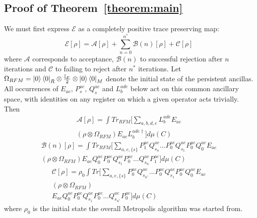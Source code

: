 \documentclass[aps,floatfix,10pt,amssymb,amsfont,amsmath,superscriptaddress,float,nofootinbib,longbibliography,nobalancelastpage,twocolumn]{revtex4-2}
\begin{document}
\subsection{Proof of Theorem~\ref{theorem:main}}
\label{section:proofmain}
We must first express $\mathcal{E}$ as a completely positive trace preserving map:
\begin{equation}
    \mathcal{E}[\rho] = \mathcal{A}[\rho] + \sum_{n=0}^{n^*} \mathcal{B}(n)[\rho] + \mathcal{C}[\rho]
\end{equation}
where $\mathcal{A}$ corresponds to acceptance, $\mathcal{B}(n)$ to successful rejection after $n$ iterations and $\mathcal{C}$ to failing to reject after $n^*$ iterations. Let $\Omega_{RFM} =\ket{0}\bra{0}_R\otimes \frac{\mathbb{I}_F}{2}\otimes\ket{0}\bra{0}_M$ denote the initial state of the persistent ancillas. All occurrences of $E_{ae}$, $P_s^{ae}$, $Q_s^{ae}$ and $L_b^{ade}$ below act on this common ancillary space, with identities on any register on which a given operator acts trivially. Then
\begin{multline}
    \mathcal{A}[\rho] = \int  Tr_{RFM}\bigg[\sum_{a,b,d,e}L_b^{ade} E_{ae} \\( \rho\otimes \Omega_{RFM}) 
     E_{ae}L^{ade\dagger}_b\bigg]d\mu(C)
\end{multline}
\begin{multline}
    \mathcal{B}(n)[\rho] = \int Tr_{RFM}\bigg[\sum_{a,e,\{s\}}P^{ae}_1Q^{ae}_{s_n}\ldots P^{ae}_0Q^{ae}_{s_1}P^{ae}_0Q^{ae}_0E_{ae}\\ ( \rho\otimes \Omega_{RFM})E_{ae}Q^{ae}_0P^{ae}_0Q^{ae}_{s_1}P^{ae}_0\ldots Q^{ae}_{s_n}P^{ae}_1\bigg]d\mu(C)
\end{multline}
\begin{multline}
    \mathcal{C}[\rho] = \rho_0 \int Tr\bigg[\sum_{a,e,\{s\}}P^{ae}_0Q^{ae}_{s_{n^*}}\ldots P^{ae}_0Q^{ae}_{s_1}P^{ae}_0Q^{ae}_0E_{ae}\\ ( \rho\otimes \Omega_{RFM})\\E_{ae}Q^{ae}_0P^{ae}_0Q^{ae}_{s_1}P^{ae}_0\ldots Q^{ae}_{s_{n^*}}P^{ae}_0\bigg]d\mu(C) 
\end{multline}
where $\rho_0$ is the initial state the overall Metropolis algorithm was started from. 
\end{document}
